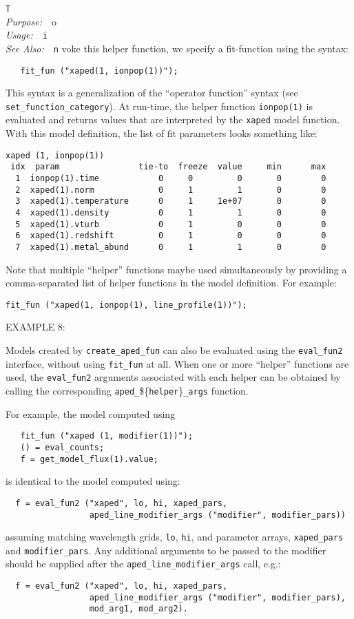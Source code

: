 \documentclass{book}
\makeatletter
\newif\ifpdf
\newenvironment{isisfunction}[4]%
{\index{{#1}@{\tt #1}}%
  \ifpdf
  \else
     \addcontentsline{toc}{subsection}{{#1} -- {#2}}
  \fi
  \vbox{
          \vspace*{\baselineskip}
          {\LARGE\tt #1}\vspace*{\baselineskip}\\
          {{\it Purpose:}~~{#2}}\\
          {{\it Usage:}~~{\tt #3}}\\
          {{\it See Also:}~~{\tt #4}}
       }
}%
{ }
\makeatother
\begin{document}
\begin{isisfunction}
To invoke this helper function, we specify a fit-function using the syntax:
\begin{verbatim}
   fit_fun ("xaped(1, ionpop(1))");
\end{verbatim}
This syntax is a generalization of the ``operator function'' syntax (see
\verb|set_function_category|).  At run-time, the helper function
\verb|ionpop(1)| is evaluated and returns values that are interpreted by the
\verb|xaped| model function. With this model definition, the list of fit
parameters looks something like:
\begin{verbatim}
xaped (1, ionpop(1))
 idx  param                tie-to  freeze  value     min      max
  1  ionpop(1).time            0     0         0       0        0
  2  xaped(1).norm             0     1         1       0        0
  3  xaped(1).temperature      0     1     1e+07       0        0
  4  xaped(1).density          0     1         1       0        0
  5  xaped(1).vturb            0     1         0       0        0
  6  xaped(1).redshift         0     1         0       0        0
  7  xaped(1).metal_abund      0     1         1       0        0
\end{verbatim}

Note that multiple ``helper'' functions maybe used simultaneously by providing
a comma-separated list of helper functions in the model definition.  For
example:
\begin{verbatim}
fit_fun ("xaped(1, ionpop(1), line_profile(1))");
\end{verbatim}

EXAMPLE 8:

Models created by \verb|create_aped_fun| can also be evaluated using the
\verb|eval_fun2| interface, without using \verb|fit_fun| at all.  When one or
more ``helper'' functions are used, the \verb|eval_fun2| arguments associated
with each helper can be obtained by calling the corresponding
\verb|aped_|\$\{\verb|helper|\}\verb|_args| function.

For example, the model computed using
\begin{verbatim}
   fit_fun ("xaped (1, modifier(1))");
   () = eval_counts;
   f = get_model_flux(1).value;
\end{verbatim}
is identical to the model computed using:
\begin{verbatim}
  f = eval_fun2 ("xaped", lo, hi, xaped_pars,
                 aped_line_modifier_args ("modifier", modifier_pars))
\end{verbatim}
assuming matching wavelength grids, \verb|lo|, \verb|hi|, and
parameter arrays, \verb|xaped_pars| and \verb|modifier_pars|.
Any additional arguments to be passed to the modifier should
be supplied after the \verb|aped_line_modifier_args| call, e.g.:
\begin{verbatim}
  f = eval_fun2 ("xaped", lo, hi, xaped_pars,
                 aped_line_modifier_args ("modifier", modifier_pars),
                 mod_arg1, mod_arg2).
\end{verbatim}


\end{isisfunction}
\end{document}
